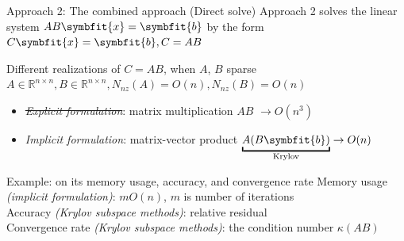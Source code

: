 \documentclass[aspectratio=169]{beamer}
\renewcommand{\bm}{\symbfit}
\begin{document}
\begin{frame}{Approach 2: The combined approach (Direct solve)}
	Approach 2 solves the linear system $ AB \bm{x} = \bm{b}$ by the form $C \bm{x} = \bm{b}, C = AB$ 
	\begin{block}{Different realizations of $C=AB$, when $A$, $B$ sparse}
		\vspace{1pt}
		$A \in \mathbb{R} ^{n \times n}, B \in \mathbb{R} ^{n \times n}, N_{nz}(A)=O(n), N_{nz}(B) = O(n)$
	\begin{itemize}
		\item \textit{\sout{Explicit formulation}}: matrix multiplication $AB$ $\rightarrow O({n}^{3})$
		\item \textit{Implicit formulation}: matrix-vector product $\underbracket{A(B \bm{b})}_{\text{Krylov}} \rightarrow O(n)$
	\end{itemize}
\end{block}
\begin{block}{Example: on its memory usage, accuracy, and convergence rate}
	\vspace{0pt}
	Memory usage \textit{(implicit formulation)}: $mO(n)$, $m$ is number of iterations\\
	Accuracy \textit{(Krylov subspace methods)}: relative residual\\
	Convergence rate \textit{(Krylov subspace methods)}: the condition number $\kappa(AB)$
\end{block}
\end{frame}
\end{document}
